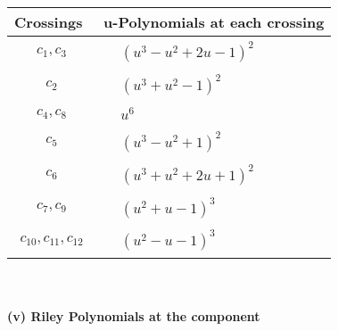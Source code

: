\documentclass[1p]{elsarticle_modified}
\theoremstyle{definition}
\begin{document}
\begin{tabular}{m{50pt}|m{274pt}}
Crossings & \hspace{64pt}u-Polynomials at each crossing \\
\hline $$\begin{aligned}c_{1},c_{3}\end{aligned}$$&$\begin{aligned}
&(u^3- u^2+2 u-1)^2
\end{aligned}$\\
\hline $$\begin{aligned}c_{2}\end{aligned}$$&$\begin{aligned}
&(u^3+u^2-1)^2
\end{aligned}$\\
\hline $$\begin{aligned}c_{4},c_{8}\end{aligned}$$&$\begin{aligned}
&u^6
\end{aligned}$\\
\hline $$\begin{aligned}c_{5}\end{aligned}$$&$\begin{aligned}
&(u^3- u^2+1)^2
\end{aligned}$\\
\hline $$\begin{aligned}c_{6}\end{aligned}$$&$\begin{aligned}
&(u^3+u^2+2 u+1)^2
\end{aligned}$\\
\hline $$\begin{aligned}c_{7},c_{9}\end{aligned}$$&$\begin{aligned}
&(u^2+u-1)^3
\end{aligned}$\\
\hline $$\begin{aligned}c_{10},c_{11},c_{12}\end{aligned}$$&$\begin{aligned}
&(u^2- u-1)^3
\end{aligned}$\\
\hline
\end{tabular}\\~\\
\newpage\renewcommand{\arraystretch}{1}
\flushleft \textbf{(v) Riley Polynomials at the component}\newline \\
\end{document}
